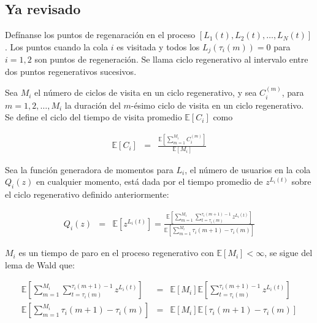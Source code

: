 \documentclass{article}
\newcommand{\esp}{\mathbb{E}}
\begin{document}
\subsection{Ya revisado}


Def\'inanse los puntos de regenaraci\'on  en el proceso $\left[L_{1}\left(t\right),L_{2}\left(t\right),\ldots,L_{N}\left(t\right)\right]$. Los puntos cuando la cola $i$ es visitada y todos los $L_{j}\left(\tau_{i}\left(m\right)\right)=0$ para $i=1,2$  son puntos de regeneraci\'on. Se llama ciclo regenerativo al intervalo entre dos puntos regenerativos sucesivos.

Sea $M_{i}$  el n\'umero de ciclos de visita en un ciclo regenerativo, y sea $C_{i}^{(m)}$, para $m=1,2,\ldots,M_{i}$ la duraci\'on del $m$-\'esimo ciclo de visita en un ciclo regenerativo. Se define el ciclo del tiempo de visita promedio $\esp\left[C_{i}\right]$ como

\begin{eqnarray*}
\esp\left[C_{i}\right]&=&\frac{\esp\left[\sum_{m=1}^{M_{i}}C_{i}^{(m)}\right]}{\esp\left[M_{i}\right]}
\end{eqnarray*}




Sea la funci\'on generadora de momentos para $L_{i}$, el n\'umero de usuarios en la cola $Q_{i}\left(z\right)$ en cualquier momento, est\'a dada por el tiempo promedio de $z^{L_{i}\left(t\right)}$ sobre el ciclo regenerativo definido anteriormente:

\begin{eqnarray*}
Q_{i}\left(z\right)&=&\esp\left[z^{L_{i}\left(t\right)}\right]=\frac{\esp\left[\sum_{m=1}^{M_{i}}\sum_{t=\tau_{i}\left(m\right)}^{\tau_{i}\left(m+1\right)-1}z^{L_{i}\left(t\right)}\right]}{\esp\left[\sum_{m=1}^{M_{i}}\tau_{i}\left(m+1\right)-\tau_{i}\left(m\right)\right]}
\end{eqnarray*}

$M_{i}$ es un tiempo de paro en el proceso regenerativo con $\esp\left[M_{i}\right]<\infty$, se sigue del lema de Wald que:


\begin{eqnarray*}
\esp\left[\sum_{m=1}^{M_{i}}\sum_{t=\tau_{i}\left(m\right)}^{\tau_{i}\left(m+1\right)-1}z^{L_{i}\left(t\right)}\right]&=&\esp\left[M_{i}\right]\esp\left[\sum_{t=\tau_{i}\left(m\right)}^{\tau_{i}\left(m+1\right)-1}z^{L_{i}\left(t\right)}\right]\\
\esp\left[\sum_{m=1}^{M_{i}}\tau_{i}\left(m+1\right)-\tau_{i}\left(m\right)\right]&=&\esp\left[M_{i}\right]\esp\left[\tau_{i}\left(m+1\right)-\tau_{i}\left(m\right)\right]
\end{eqnarray*}
\end{document}
